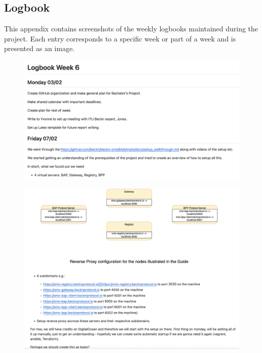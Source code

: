 \subsection{Logbook} \label{logbook_appendix}
This appendix contains screenshots of the weekly logbooks maintained during the project. Each entry corresponds to a specific week or part of a week and is presented as an image.


\begin{figure}[H]
    \centering
    \includegraphics[width=\textwidth]{Images/week_6.1.png}
\end{figure}


\begin{figure}[H]
    \centering
    \includegraphics[width=\textwidth]{Images/week_6.2.png}
\end{figure}

